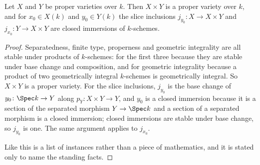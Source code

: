 \begin{lemma}
\label{lem:cube-product-variety}
Let $X$ and $Y$ be proper varieties over $k$.  Then $X\times Y$ is a proper
variety over $k$, and for $x_0\in X(k)$ and $y_0\in Y(k)$ the slice inclusions
$j_{y_0}\colon X\to X\times Y$ and $j_{x_0}\colon Y\to X\times Y$ are closed
immersions of $k$-schemes.
\end{lemma}
\begin{proof}
Separatedness, finite type, properness and geometric integrality are all stable
under products of $k$-schemes: for the first three because they are stable
under base change and composition, and for geometric integrality because a
product of two geometrically integral $k$-schemes is geometrically integral.
So $X\times Y$ is a proper variety.  For the slice inclusions,
$j_{y_0}$ is the base change of $y_0\colon\Spec k\to Y$ along
$p_Y\colon X\times Y\to Y$, and $y_0$ is a closed immersion because it is a
section of the separated morphism $Y\to\Spec k$ and a section of a separated
morphism is a closed immersion; closed immersions are stable under base change,
so $j_{y_0}$ is one.  The same argument applies to $j_{x_0}$.

Like  this is a list of instances rather
than a piece of mathematics, and it is stated only to name the standing facts.
\end{proof}

